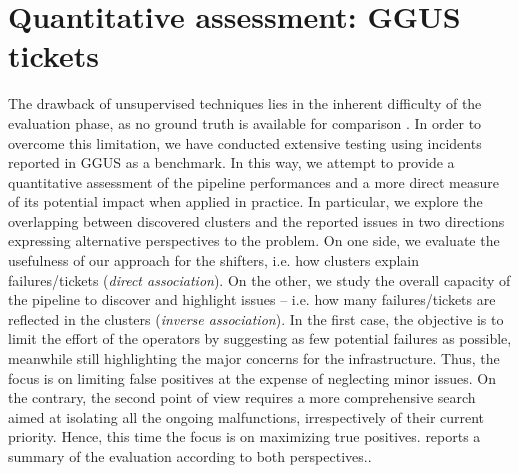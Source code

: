 \section{Quantitative assessment: GGUS tickets}
\label{sec:opint:quantitative}


The drawback of unsupervised techniques lies in the inherent difficulty of the evaluation phase, as no ground truth is available for comparison \cite{von2012clustering}.
In order to overcome this limitation,
we have conducted extensive testing using incidents reported in GGUS as a benchmark. 
In this way, we attempt to provide a quantitative assessment of the pipeline performances and a more direct measure of its potential impact when applied in practice.
In particular, we explore the overlapping between discovered clusters and the reported issues in two directions expressing alternative perspectives to the problem. 
On one side, we evaluate the usefulness of our approach for the shifters, i.e. how clusters explain failures/tickets (\textit{direct association}).
On the other, we study the overall capacity of the pipeline to discover and highlight issues -- i.e. how many failures/tickets are reflected in the clusters (\textit{inverse association}).
In the first case, the objective is to limit the effort of the operators by suggesting as few potential failures as possible, meanwhile still highlighting the major concerns for the infrastructure. Thus, the focus is on limiting false positives at the expense of neglecting minor issues.
On the contrary, the second point of view requires a more comprehensive search aimed at isolating all the ongoing malfunctions, irrespectively of their current priority. Hence, this time the focus is on maximizing true positives.
 reports a summary of the evaluation according to both perspectives..
\newcommand{\specialcell}[2][c]{\begin{tabular}[#1]{@{}c@{}}#2\end{tabular}}
